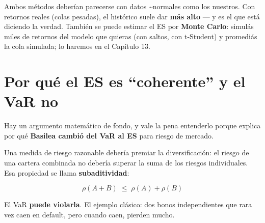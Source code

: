 \documentclass[
  spanish,
  letterpaper,
  DIV=11,
  numbers=noendperiod]{scrreprt}
\begin{document}
Ambos métodos deberían parecerse con datos \textasciitilde normales como
los nuestros. Con retornos reales (colas pesadas), el histórico suele
dar \textbf{más alto} --- y es el que está diciendo la verdad. También
se puede estimar el ES por \textbf{Monte Carlo}: simulás miles de
retornos del modelo que quieras (con saltos, con t-Student) y promediás
la cola simulada; lo haremos en el Capítulo 13.

\section{Por qué el ES es ``coherente'' y el VaR
no}\label{por-quuxe9-el-es-es-coherente-y-el-var-no}

Hay un argumento matemático de fondo, y vale la pena entenderlo porque
explica por qué \textbf{Basilea cambió del VaR al ES} para riesgo de
mercado.

Una medida de riesgo razonable debería premiar la diversificación: el
riesgo de una cartera combinada no debería superar la suma de los
riesgos individuales. Esa propiedad se llama \textbf{subaditividad}:

\[\rho(A + B) \;\le\; \rho(A) + \rho(B)\]

El VaR \textbf{puede violarla}. El ejemplo clásico: dos bonos
independientes que rara vez caen en default, pero cuando caen, pierden
mucho.
\end{document}
